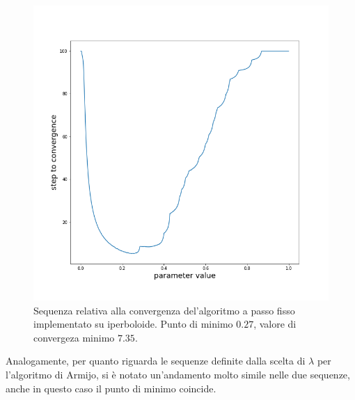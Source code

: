\documentclass[a4paper, 12pt]{article}
\begin{document}
\begin{figure}[H] %
    \centering\includegraphics[width=1\textwidth]{fixed_step_parameter_hyperboloid.png}
    \caption{Sequenza relativa alla convergenza del'algoritmo a passo fisso implementato su iperboloide. Punto di minimo $0.27$, valore di convergeza minimo $7.35$.}
\end{figure}
Analogamente, per quanto riguarda le sequenze definite dalla scelta di $\lambda$ per l'algoritmo di Armijo, si è notato un'andamento molto simile nelle due sequenze, anche in questo caso il punto di minimo coincide.\\
\end{document}
